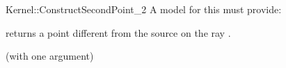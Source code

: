 \begin{ccRefFunctionObjectConcept}{Kernel::ConstructSecondPoint_2}
A model for this must provide:


 {returns a point different from the source  on
  the ray .}

\ccRefines
{} (with one argument)

\ccSeeAlso
{}

\end{ccRefFunctionObjectConcept}

